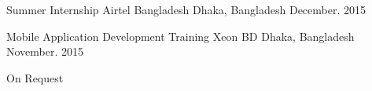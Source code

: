 \begin{cventries}
	
	\cventry
	{Summer Internship} %
	{Airtel Bangladesh} %
	{Dhaka, Bangladesh} %
	{December. 2015} %
	{}
	
	\vspace{-5.0mm}
	\cventry
	{Mobile Application Development Training} %
	{Xeon BD} %
	{Dhaka, Bangladesh} %
	{November. 2015} %
	{}
	
\end{cventries}
\vspace{-8.0 mm}
\begin{cventries}
	\begin{cvitems} %
		\item {On Request}
	\end{cvitems}
\end{cventries}